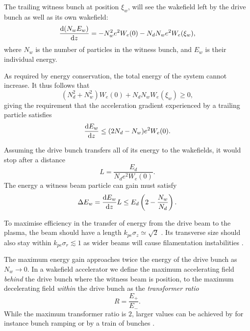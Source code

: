 The trailing witness bunch at position $\xi_{w}$, will see the wakefield left by the drive bunch as well as its own wakefield:
\begin{equation}
    \frac{\mathrm{d} (N_{w}E_{w})}{\mathrm{d} z}
        = - N_{w}^{2}e^{2}W_{e}(0) - N_{d}N_{w}e^{2}W_{e}(\xi_{w}), \label{EQ:TRat:Witness}
\end{equation}
where $N_{w}$ is the number of particles in the witness bunch, and $E_{w}$ is their individual energy.

As required by energy conservation, the total energy of the system cannot increase. It thus follows that
\begin{equation}
    (N_{d}^{2} + N_{w}^{2})W_{e}(0) + N_{d}N_{w}W_{e}(\xi_{w}) \geq 0, \label{EQ:TRat:EConv}
\end{equation}
giving the requirement that the acceleration gradient experienced by a trailing particle satisfies
\begin{equation}
    \frac{\mathrm{d} E_{w}}{\mathrm{d} z} \leq (2N_{d} - N_{w})e^{2}W_{e}(0). \label{EQ:TRat:Grad}
\end{equation}

Assuming the drive bunch transfers all of its energy to the wakefields, it would stop after a distance
\begin{equation}
    L = \frac{E_{d}}{N_{d}e^{2}W_{e}(0)}. \label{EQ:Trat:LStop}
\end{equation}
The energy a witness beam particle can gain must satisfy
\begin{equation}
    \Delta E_{w} = \frac{\mathrm{d} E_{w}}{\mathrm{d} z}L
                 \leq E_{d}\left(2-\frac{N_{w}}{N_{d}}\right). \label{EQ:TRat:DeltaE}
\end{equation}

To maximise efficiency in the transfer of energy from the drive beam to the plasma, the beam should have a length $k_{pe}\sigma_{z} \simeq \sqrt{2}$ \cite{lu:2005,lee:2000}. Its transverse size should also stay within $k_{pe}\sigma_{r} \lesssim 1$ as wider beams will cause filamentation instabilities \cite{allen:2012,sentoku:2003}.

The maximum energy gain approaches twice the energy of the drive bunch as $N_{w} \to 0$. In a wakefield accelerator we define the maximum accelerating field \textit{behind} the drive bunch where the witness beam is position, to the maximum decelerating field \textit{within} the drive bunch as the \textit{transformer ratio} \cite{muggli:2017}
\begin{equation}
    R = \frac{E_{+}}{E_{-}}. \label{EQ:TRat}
\end{equation}
While the maximum transformer ratio is $2$, larger values can be achieved by for instance bunch ramping \cite{bane:1985} or by a train of bunches \cite{jing:2006}.

